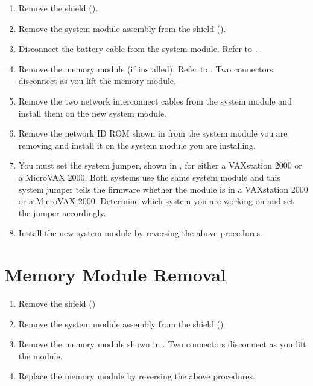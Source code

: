\begin{enumerate}

\item	Remove the shield ().

\item	Remove the system module assembly from the shield ().

\item	Disconnect the battery cable from the system module. Refer to .

\newpage

\item	Remove the memory module (if installed). Refer to . Two
		connectors disconnect as you lift the memory module.

\item	Remove the two network interconnect cables from the system module
		and install them on the new system module.

\newpage

\item	Remove the network ID ROM shown in  from the system
		module you are removing and install it on the system module you are
		installing.
\newpage

\item	You must set the system jumper, shown in , for either a
		VAXstation 2000 or a MicroVAX 2000. Both systems use the same 
		system module and this system jumper teils the firmware whether the 
		module is in a VAXstation 2000 or a MicroVAX 2000. Determine which 
		system you are working on and set the jumper accordingly.

\item	Install the new system module by reversing the above procedures.

\end{enumerate}

\newpage

\section{Memory Module Removal}

\begin{enumerate}

\item	Remove the shield ()

\item	Remove the system module assembly from the shield ()

\item	Remove the memory module shown in . Two connectors
		disconnect as you lift the module.


\item	Replace the memory module by reversing the above procedures.

\end{enumerate}
\newpage

